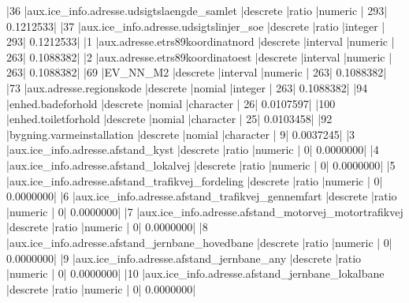 \documentclass{report}
\begin{document}
\begin{Schunk}
\begin{Soutput}
|36  |aux.ice_info.adresse.udsigtslaengde_samlet                    |descrete           |ratio          |numeric         |            293|          0.1212533|
|37  |aux.ice_info.adresse.udsigtslinjer_soe                        |descrete           |ratio          |integer         |            293|          0.1212533|
|1   |aux.adresse.etrs89koordinatnord                               |descrete           |interval       |numeric         |            263|          0.1088382|
|2   |aux.adresse.etrs89koordinatoest                               |descrete           |interval       |numeric         |            263|          0.1088382|
|69  |EV_NN_M2                                                      |descrete           |interval       |numeric         |            263|          0.1088382|
|73  |aux.adresse.regionskode                                       |descrete           |nomial         |integer         |            263|          0.1088382|
|94  |enhed.badeforhold                                             |descrete           |nomial         |character       |             26|          0.0107597|
|100 |enhed.toiletforhold                                           |descrete           |nomial         |character       |             25|          0.0103458|
|92  |bygning.varmeinstallation                                     |descrete           |nomial         |character       |              9|          0.0037245|
|3   |aux.ice_info.adresse.afstand_kyst                             |descrete           |ratio          |numeric         |              0|          0.0000000|
|4   |aux.ice_info.adresse.afstand_lokalvej                         |descrete           |ratio          |numeric         |              0|          0.0000000|
|5   |aux.ice_info.adresse.afstand_trafikvej_fordeling              |descrete           |ratio          |numeric         |              0|          0.0000000|
|6   |aux.ice_info.adresse.afstand_trafikvej_gennemfart             |descrete           |ratio          |numeric         |              0|          0.0000000|
|7   |aux.ice_info.adresse.afstand_motorvej_motortrafikvej          |descrete           |ratio          |numeric         |              0|          0.0000000|
|8   |aux.ice_info.adresse.afstand_jernbane_hovedbane               |descrete           |ratio          |numeric         |              0|          0.0000000|
|9   |aux.ice_info.adresse.afstand_jernbane_any                     |descrete           |ratio          |numeric         |              0|          0.0000000|
|10  |aux.ice_info.adresse.afstand_jernbane_lokalbane               |descrete           |ratio          |numeric         |              0|          0.0000000|

\end{Soutput}
\end{Schunk}
\end{document}
